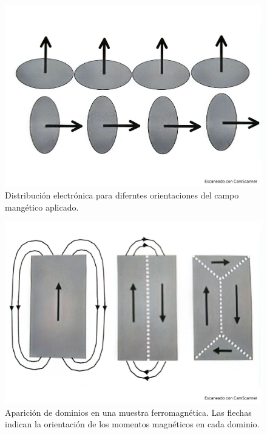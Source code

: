 \begin{figure}[h!] \centering
	\includegraphics[scale=0.35]{Cuerpo/Ch_10/Fotos libro 6.pdf}
	\caption{Distribución electrónica para diferntes orientaciones del campo mangético aplicado.}
	\label{Fig:10-06}
\end{figure}
\begin{figure}[h!] \centering
	\includegraphics[scale=0.35]{Cuerpo/Ch_10/Fotos libro 7.pdf}
	\caption{Aparición de dominios en una muestra ferromagnética. Las flechas indican la orientación de los momentos magnéticos en cada dominio.}
	\label{Fig:10-07}
\end{figure}
